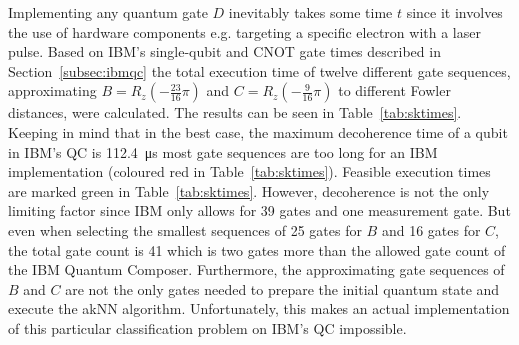 Implementing any quantum gate $D$ inevitably takes some time $t$ since it involves the use of hardware components e.g. targeting a specific electron with a laser pulse. Based on IBM's single-qubit and CNOT gate times described in Section~\ref{subsec:ibmqc} the total execution time of twelve different gate sequences, approximating $B = R_z(-\frac{23}{16}\pi)$ and $C = R_z(-\frac{9}{16}\pi)$ to different Fowler distances, were calculated. The results can be seen in Table~\ref{tab:sktimes}. Keeping in mind that in the best case, the maximum decoherence time of a qubit in IBM's QC is \SI{112.4}{\micro\second} most gate sequences are too long for an IBM implementation (coloured red in Table~\ref{tab:sktimes}). Feasible execution times are marked green in Table~\ref{tab:sktimes}. However, decoherence is not the only limiting factor since IBM only allows for 39 gates and one measurement gate. But even when selecting the smallest sequences of 25 gates for $B$ and 16 gates for $C$, the total gate count is 41 which is two gates more than the allowed gate count of the IBM Quantum Composer. Furthermore, the approximating gate sequences of $B$ and $C$ are not the only gates needed to prepare the initial quantum state and execute the akNN algorithm. Unfortunately, this makes an actual implementation of this particular classification problem on IBM's QC impossible.


